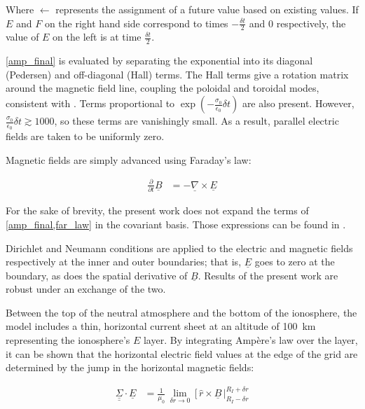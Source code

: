 \documentclass[draft,linenumbers]{agujournal}
\begin{document}
Where $\leftarrow$ represents the assignment of a future value based on existing values. If $E$ and $F$ on the right hand side correspond to times $-\frac{\delta \! t}{2}$ and $0$ respectively, the value of $E$ on the left is at time $\frac{\delta \! t}{2}$.

\cref{amp_final} is evaluated by separating the exponential into its diagonal (Pedersen) and off-diagonal (Hall) terms. The Hall terms give a rotation matrix around the magnetic field line, coupling the poloidal and toroidal modes, consistent with \citet{hughes_1974}. Terms proportional to $\exp \left( - \frac{\sigma_0}{\epsilon_0}\delta \! t \right)$ are also present. However, $\frac{\sigma_0}{\epsilon_0}\delta \! t \gtrsim 1000$, so these terms are vanishingly small. As a result, parallel electric fields are taken to be uniformly zero.

Magnetic fields are simply advanced using Faraday's law:
\begin{linenomath*}
\begin{align}
    \label{far_law}
    \frac{\partial}{\partial t} \underline{B} &= - \underline{\nabla} \times \underline{E}
\end{align}
\end{linenomath*}

For the sake of brevity, the present work does not expand the terms of \cref{amp_final,far_law} in the covariant basis. Those expressions can be found in \citet{mceachern_2016}.


Dirichlet and Neumann conditions are applied to the electric and magnetic fields respectively at the inner and outer boundaries; that is, $\underline{E}$ goes to zero at the boundary, as does the spatial derivative of $\underline{B}$. Results of the present work are robust under an exchange of the two.

Between the top of the neutral atmosphere and the bottom of the ionosphere, the model includes a thin, horizontal current sheet at an altitude of \SI{100}{\km} representing the ionosphere's $E$ layer\citep{lysak_2004}. By integrating Amp\`ere's law over the layer, it can be shown\citep{fujita_1988} that the horizontal electric field values at the edge of the grid are determined by the jump in the horizontal magnetic fields:
\begin{linenomath*}
\begin{align}
  \label{jump_condition}
  \underline{\underline{\Sigma}} \cdot \underline{E} &= \frac{1}{\mu_0} \,
    \displaystyle\lim_{\delta \! r \rightarrow 0} \, \bigg[ \, \hat{r} \times \underline{B}
    \, \bigg|^{R_I + \delta \! r}_{R_I - \delta \! r}
\end{align}
\end{linenomath*}
\end{document}
